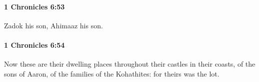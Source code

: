 		\paragraph{1 Chronicles 6:53} %
			\label{1CHRONICLES-6-53}

			Zadok his son, Ahimaaz his son.


		\paragraph{1 Chronicles 6:54} %
			\label{1CHRONICLES-6-54}

			Now these are their dwelling places throughout their castles in their coasts, of the sons of Aaron, of the families of the Kohathites: for theirs was the lot.


